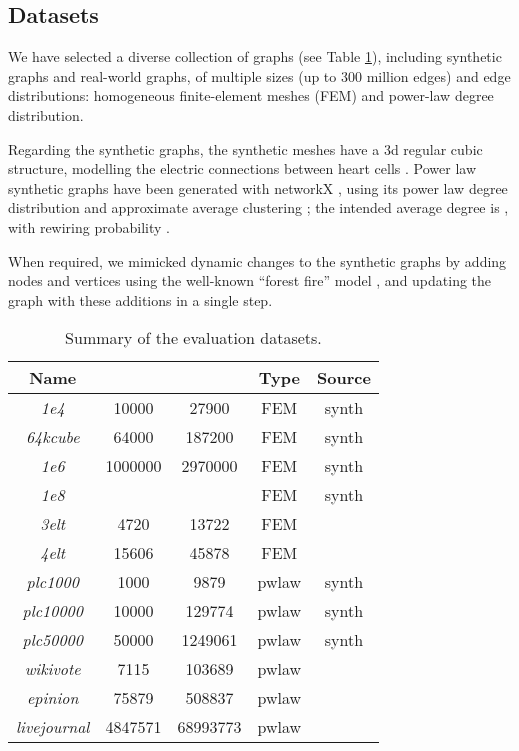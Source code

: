 \documentclass{sig-alternate-10pt}
\begin{document}
\subsection{Datasets}
\label{sec:dataset}

We have selected a diverse collection of graphs (see Table \ref{table:summary}), including synthetic graphs and real-world graphs, of multiple sizes (up to 300 million edges) and edge distributions: homogeneous finite-element meshes (FEM) and power-law degree distribution. 

Regarding the synthetic graphs, the synthetic meshes have a 3d regular cubic structure, modelling the electric connections between heart cells \cite{Tusscher2004}. Power law synthetic graphs have been generated with networkX \cite{networkx}, using its power law degree distribution and approximate average clustering \cite{powerlawgen}; the intended average degree is , with rewiring 
probability . 

When required, we mimicked dynamic changes to the synthetic graphs by adding nodes and vertices using the well-known ``forest fire'' model \cite{Leskovec2007}, and updating the graph with these additions in a single step.

\begin{table}[h!b!p!]
\vspace{-10pt}
\caption{ Summary of the evaluation datasets.}
\scriptsize
\label{table:summary} 
\center
    \begin{tabular}{ | c | c | c | c | c |}
    \hline
    Name &  &  & Type & Source \\ \hline
      \textit{1e4} & 10000 & 27900 & FEM & synth \\ \hline
      \textit{64kcube} & 64000 & 187200 & FEM & synth \\ \hline
      \textit{1e6} & 1000000 & 2970000 & FEM & synth \\ \hline
      \textit{1e8} &  &  & FEM & synth \\ \hline
      \textit{3elt} & 4720 & 13722 & FEM & \cite{femgraphs} \\ \hline
      \textit{4elt} & 15606 & 45878 & FEM & \cite{femgraphs} \\ \hline
      \textit{plc1000} & 1000 & 9879 & pwlaw & synth \\ \hline
      \textit{plc10000} & 10000 & 129774 & pwlaw & synth \\ \hline
      \textit{plc50000} & 50000 & 1249061 & pwlaw & synth \\ \hline
      \textit{wikivote} & 7115 &  103689 & pwlaw & \cite{wikivote} \\ \hline
      \textit{epinion} & 75879 & 508837 & pwlaw & \cite{epinions} \\ \hline
       \textit{livejournal} & 4847571 & 68993773 & pwlaw & \cite{lwa} \\ \hline       
    \end{tabular}
\end{table}
\end{document}
